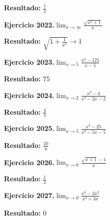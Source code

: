 \documentclass[10pt,a4paper]{article}
\begin{document}
\begin{solbox}
\textbf{Resultado:} \(\displaystyle \frac{1}{2}\)
\end{solbox}

\begin{ejbox}
\textbf{Ejercicio 2022.}\quad $\lim_{x\to \infty} \frac{\sqrt{x^2+1}}{x}$
\end{ejbox}

\begin{solbox}
\textbf{Resultado:} \(\displaystyle \sqrt{1+\frac{1}{x^2}} \to 1\)
\end{solbox}

\begin{ejbox}
\textbf{Ejercicio 2023.}\quad $\lim_{x\to 5} \frac{x^3-125}{x-5}$
\end{ejbox}

\begin{solbox}
\textbf{Resultado:} \(\displaystyle 75\)
\end{solbox}

\newpage
\begin{ejbox}
\textbf{Ejercicio 2024.}\quad $\lim_{x\to 2} \frac{x^2-4}{x^2-2x-2}$
\end{ejbox}

\begin{solbox}
\textbf{Resultado:} \(\displaystyle \frac{4}{3}\)
\end{solbox}

\begin{ejbox}
\textbf{Ejercicio 2025.}\quad $\lim_{x\to 5} \frac{x^2-25}{x^2-5x-5}$
\end{ejbox}

\begin{solbox}
\textbf{Resultado:} \(\displaystyle \frac{10}{6}\)
\end{solbox}

\begin{ejbox}
\textbf{Ejercicio 2026.}\quad $\lim_{x\to 0} \frac{\sqrt{x+1}-1}{x}$
\end{ejbox}

\begin{solbox}
\textbf{Resultado:} \(\displaystyle \frac{1}{2}\)
\end{solbox}

\newpage
\begin{ejbox}
\textbf{Ejercicio 2027.}\quad $\lim_{x\to 0} \frac{x^3-2x^2}{x^2+3x}$
\end{ejbox}

\begin{solbox}
\textbf{Resultado:} \(\displaystyle 0\)
\end{solbox}
\end{document}
